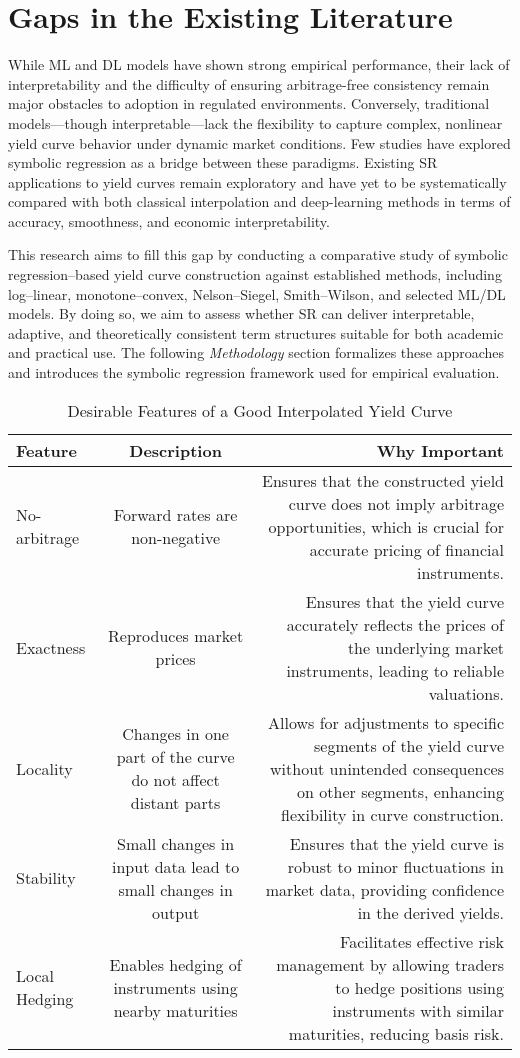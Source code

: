 \documentclass[12pt]{report}
\begin{document}
\section{Gaps in the Existing Literature}

While ML and DL models have shown strong empirical performance, their lack of interpretability and the difficulty of ensuring arbitrage-free consistency remain major obstacles to adoption in regulated environments.  
Conversely, traditional models—though interpretable—lack the flexibility to capture complex, nonlinear yield curve behavior under dynamic market conditions.  
Few studies have explored symbolic regression as a bridge between these paradigms.  
Existing SR applications to yield curves remain exploratory and have yet to be systematically compared with both classical interpolation and deep-learning methods in terms of accuracy, smoothness, and economic interpretability.  

This research aims to fill this gap by conducting a comparative study of symbolic regression–based yield curve construction against established methods, including log–linear, monotone–convex, Nelson–Siegel, Smith–Wilson, and selected ML/DL models.  
By doing so, we aim to assess whether SR can deliver interpretable, adaptive, and theoretically consistent term structures suitable for both academic and practical use.  
The following \textit{Methodology} section formalizes these approaches and introduces the symbolic regression framework used for empirical evaluation.


\begin{table}[h]
\centering
\caption{Desirable Features of a Good Interpolated Yield Curve}
\begin{tabularx}{\textwidth}{l c r}
\toprule
Feature & Description & Why Important \\
\midrule
No-arbitrage & Forward rates are non-negative & Ensures that the constructed yield curve does not imply arbitrage opportunities, which is crucial for accurate pricing of financial instruments. \\
Exactness & Reproduces market prices & Ensures that the yield curve accurately reflects the prices of the underlying market instruments, leading to reliable valuations. \\
Locality & Changes in one part of the curve do not affect distant parts & Allows for adjustments to specific segments of the yield curve without unintended consequences on other segments, enhancing flexibility in curve construction. \\
Stability & Small changes in input data lead to small changes in output & Ensures that the yield curve is robust to minor fluctuations in market data, providing confidence in the derived yields. \\
Local Hedging & Enables hedging of instruments using nearby maturities & Facilitates effective risk management by allowing traders to hedge positions using instruments with similar maturities, reducing basis risk. \\
\bottomrule
\end{tabularx}
\end{table}
\end{document}
